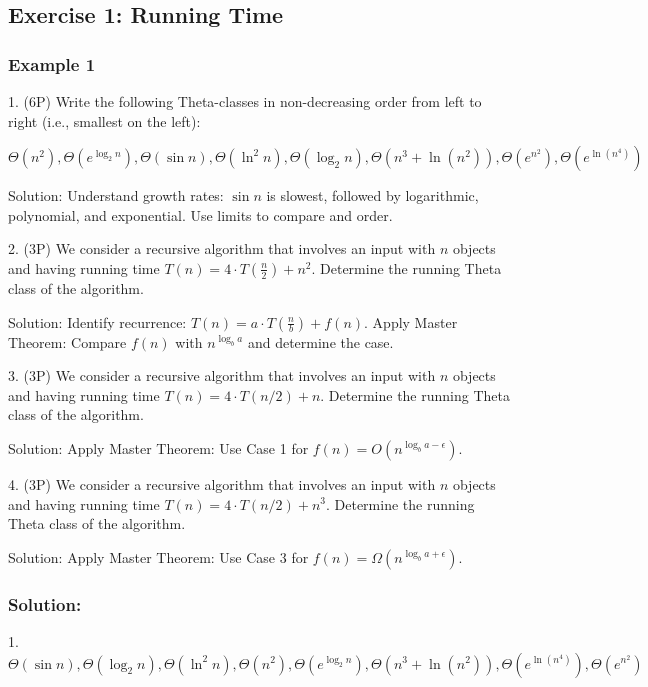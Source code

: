 \newpage
\clearpage


\subsection{Exercise 1: Running Time}

\subsubsection{Example 1}
1. (6P) Write the following Theta-classes in non-decreasing order from left to right (i.e., smallest on the left):

$\Theta(n^2), \Theta(e^{\log_2 n}), \Theta(\sin n), \Theta(\ln^2 n), \Theta(\log_2 n), \Theta(n^3 + \ln(n^2)), \Theta(e^{n^2}), \Theta(e^{\ln(n^4)})$

Solution: Understand growth rates: $\sin n$ is slowest, followed by logarithmic, polynomial, and exponential. Use limits to compare and order.

2. (3P) We consider a recursive algorithm that involves an input with $n$ objects and having running time $T(n) = 4 \cdot T\left(\frac{n}{2}\right) + n^2$. Determine the running Theta class of the algorithm.

Solution: Identify recurrence: $T(n) = a \cdot T\left(\frac{n}{b}\right) + f(n)$. Apply Master Theorem: Compare $f(n)$ with $n^{\log_b a}$ and determine the case.

3. (3P) We consider a recursive algorithm that involves an input with $n$ objects and having running time $T(n) = 4 \cdot T(n/2) + n$. Determine the running Theta class of the algorithm.

Solution: Apply Master Theorem: Use Case 1 for $f(n) = O(n^{\log_b a - \epsilon})$.

4. (3P) We consider a recursive algorithm that involves an input with $n$ objects and having running time $T(n) = 4 \cdot T(n/2) + n^3$. Determine the running Theta class of the algorithm.

Solution: Apply Master Theorem: Use Case 3 for $f(n) = \Omega(n^{\log_b a + \epsilon})$.

\subsubsection{Solution:}
1. $\Theta(\sin n), \Theta(\log_2 n), \Theta(\ln^2 n), \Theta(n^2), \Theta(e^{\log_2 n}), \Theta(n^3 + \ln(n^2)), \Theta(e^{\ln(n^4)}), \Theta(e^{n^2})$

